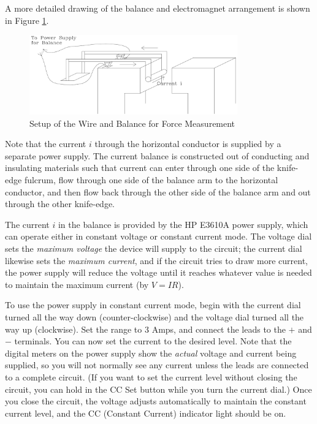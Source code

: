 A more detailed drawing of the balance and electromagnet arrangement is shown in Figure {\ref{fig:measureforce}}.

\begin{figure}[h]
\centering
\includegraphics[width=0.8\textwidth]{./Exp4/pic/image3.png}
\caption{Setup of the Wire and Balance for Force Measurement}
\label{fig:measureforce}
\end{figure}

Note that the current $i$ through the horizontal conductor is supplied by a separate power supply. The current balance is constructed out of conducting and insulating materials such that current can enter through one side of the knife-edge fulcrum, flow through one side of the balance arm to the horizontal conductor, and then flow back through the other side of the balance arm and out through the other knife-edge. \myskip

The current $i$ in the balance is provided by the HP E3610A power supply, which can operate either in constant voltage or constant current mode. The voltage dial sets the \emph{maximum voltage} the device will supply to the circuit; the current dial likewise sets the \emph{maximum current}, and if the circuit tries to draw more current, the power supply will reduce the voltage until it reaches whatever value is needed to maintain the maximum current (by $V = IR$). \myskip

To use the power supply in constant current mode, begin with the current dial turned all the way down (counter-clockwise) and the voltage dial turned all the way up (clockwise). Set the range to 3 Amps, and connect the leads to the $+$ and $-$ terminals. You can now set the current to the desired level. Note that the digital meters on the power supply show the \emph{actual} voltage and current being supplied, so you will not normally see any current unless the leads are connected to a complete circuit. (If you want to set the current level without closing the circuit, you can hold in the CC Set button while you turn the current dial.) Once you close the circuit, the voltage adjusts automatically to maintain the constant current level, and the CC (Constant Current) indicator light should be on.

